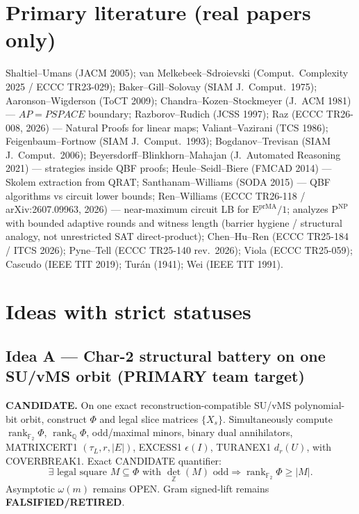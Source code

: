 \documentclass[11pt]{article}
\begin{document}
\section*{Primary literature (real papers only)}
Shaltiel--Umans (JACM 2005); van Melkebeek--Sdroievski (Comput.\ Complexity 2025 / ECCC TR23-029);
Baker--Gill--Solovay (SIAM J.\ Comput.\ 1975); Aaronson--Wigderson (ToCT 2009);
Chandra--Kozen--Stockmeyer (J.\ ACM 1981) --- $AP=PSPACE$ boundary;
Razborov--Rudich (JCSS 1997); Raz (ECCC TR26-008, 2026) --- Natural Proofs for linear maps;
Valiant--Vazirani (TCS 1986); Feigenbaum--Fortnow (SIAM J.\ Comput.\ 1993);
Bogdanov--Trevisan (SIAM J.\ Comput.\ 2006);
Beyersdorff--Blinkhorn--Mahajan (J.\ Automated Reasoning 2021) --- strategies inside QBF proofs;
Heule--Seidl--Biere (FMCAD 2014) --- Skolem extraction from QRAT;
Santhanam--Williams (SODA 2015) --- QBF algorithms vs circuit lower bounds;
Ren--Williams (ECCC TR26-118 / arXiv:2607.09963, 2026) --- near-maximum circuit LB for
$\mathrm{E}^{\mathrm{prMA}}/1$; analyzes $\mathrm{P}^{\mathrm{NP}}$ with bounded adaptive rounds
and witness length (barrier hygiene / structural analogy, not unrestricted SAT direct-product);
Chen--Hu--Ren (ECCC TR25-184 / ITCS 2026); Pyne--Tell (ECCC TR25-140 rev.\ 2026);
Viola (ECCC TR25-059); Cascudo (IEEE TIT 2019); Tur\'an (1941); Wei (IEEE TIT 1991).

\section*{Ideas with strict statuses}
\subsection*{Idea A --- Char-2 structural battery on one SU/vMS orbit (PRIMARY team target)}
\textbf{CANDIDATE.} On one exact reconstruction-compatible SU/vMS polynomial-bit orbit, construct
$\Phi$ and legal slice matrices $\{X_s\}$. Simultaneously compute
$\operatorname{rank}_{\mathbb F_2}\Phi$, $\operatorname{rank}_{\mathbb Q}\Phi$, odd/maximal minors,
binary dual annihilators, MATRIXCERT1 $(\tau_L,r,|E|)$, EXCESS1 $\epsilon(I)$, TURANEX1 $d_r(U)$,
with COVERBREAK1. Exact CANDIDATE quantifier:
\[
\exists\text{ legal square }M\subseteq\Phi\text{ with }\det_{\mathbb Z}(M)\text{ odd}
\Rightarrow\operatorname{rank}_{\mathbb F_2}\Phi\ge|M|.
\]
Asymptotic $\omega(m)$ remains OPEN. Gram signed-lift remains \textbf{FALSIFIED/RETIRED}.
\end{document}

